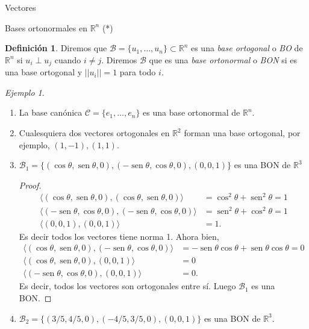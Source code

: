 \documentclass[a4paper,12pt,twoside,spanish,reqno]{amsbook}
\numberwithin{equation}{section}
\theoremstyle{definition}
\newtheorem{definicion}[teorema]{Definici\'on}
\theoremstyle{remark}
\newtheorem*{ejemplo*}{Ejemplo}
\newcommand{\la}{\langle}
\newcommand{\ra}{\rangle}
\newcommand{\R}{\mathbb R}
\newcommand{\sen}{\operatorname{sen}}
\begin{document}
\begin{chapter}{Vectores}
   \begin{section}{Bases ortonormales en $\R^n$ (*)}


    \begin{definicion} 
        Diremos que $\mathcal B =\{u_1,\ldots,u_n\}\subset \R^n$ es una \textit{base ortogonal} o \textit{BO} de $\R^n$ si $u_i \perp u_j$ cuando $i\ne j$. Diremos $\mathcal B$ que es una \textit{base ortonormal} o \textit{BON} si es una base ortogonal y $||u_i||=1$ para todo $i$.  
    \end{definicion}

    \begin{ejemplo*} 

        \

        \begin{enumerate}
            \item La base canónica $\mathcal C= \{e_1,\ldots,e_n\}$  es una base ortonormal de $\R^n$. 
            \item Cualesquiera dos vectores ortogonales en $\R^2$ forman una base ortogonal, por ejemplo, $(1,-1), (1,1)$.
            \item $\mathcal B_1 = \{(\cos\theta, \sen\theta,0),  (-\sen\theta, \cos\theta,0 ),  (0,0,1)\}$ es una BON  de $\R^3$
            \begin{proof}
                \begin{align*}
                    \la (\cos\theta, \sen\theta,0), (\cos\theta, \sen\theta,0)\ra &= \cos^2\theta+ \sen^2\theta = 1\\
                    \la (-\sen\theta, \cos\theta,0 ),  (-\sen\theta, \cos\theta,0 )\ra &= \sen^2\theta +\cos^2\theta = 1\\
                    \la (0,0,1),  (0,0,1)\ra &=1.
                \end{align*}
                Es decir todos los vectores tiene norma 1. Ahora bien,
                \begin{align*}
                    \la (\cos\theta, \sen\theta,0),  (-\sen\theta, \cos\theta,0 )\ra &= -\sen\theta\cos\theta+ \sen\theta\cos\theta = 0\\
                    \la (\cos\theta, \sen\theta,0),  (0,0,1 )\ra &=0\\
                    \la  (-\sen\theta, \cos\theta,0 ),  (0,0,1 )\ra &=0.
                \end{align*}
                Es decir,  todos los vectores son ortogonales entre sí. Luego $\mathcal B_1$  es una BON.
                
            \end{proof} 
            \item  $\mathcal B_2 = \{(3/5, 4/5,0 ), (- 4/5, 3/5,0),  (0,0,1 )\}$ es una BON  de $\R^3$. 
            

\end{enumerate}
\end{ejemplo*}
\end{section}
\end{chapter}
\end{document}

